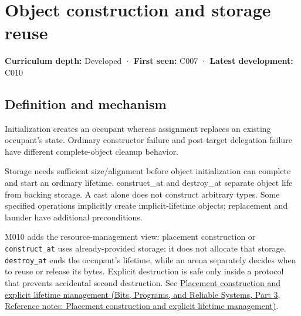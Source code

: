 \hypertarget{appendix-a82f9c438857}{}\label{referencestart:appendix-a82f9c438857}
\section{Object construction and storage reuse}\label{appendix-a82f9c438857-object-construction-and-storage-reuse}

\hypertarget{appendix-a82f9c438857-object-construction-and-storage-reuse}{}

\textbf{Curriculum depth:} Developed · \textbf{First seen:} C007 · \textbf{Latest development:} C010

\begin{allmightroledefinition}

\subsection{Definition and mechanism}\label{appendix-a82f9c438857-definition-and-mechanism}

\hypertarget{appendix-a82f9c438857-definition-and-mechanism}{}

Initialization creates an occupant whereas assignment replaces an existing occupant's state. Ordinary constructor failure and post-target delegation failure have different complete-object cleanup behavior.

\end{allmightroledefinition}

Storage needs sufficient size/alignment before object initialization can complete and start an ordinary lifetime. construct\_at and destroy\_at separate object life from backing storage. A cast alone does not construct arbitrary types. Some specified operations implicitly create implicit-lifetime objects; replacement and launder have additional preconditions.

M010 adds the resource-management view: placement construction or \texttt{construct\_at} uses already-provided storage; it does not allocate that storage. \texttt{destroy\_at} ends the occupant's lifetime, while an arena separately decides when to reuse or release its bytes. Explicit destruction is safe only inside a protocol that prevents accidental second destruction. See \href{../01-Bits-Programs-and-Reliable-Systems-P03/main.pdf\#nameddest=appendix-f56c3e43fd4e}{Placement construction and explicit lifetime management (Bits, Programs, and Reliable Systems, Part 3, Reference notes: Placement construction and explicit lifetime management)}.

